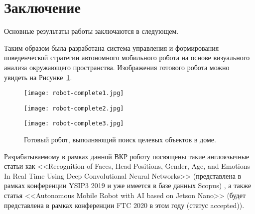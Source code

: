 \chapter*{Заключение}                       %


Основные результаты работы заключаются в следующем.

Таким образом была разработана система управления и формирования поведенческой стратегии автономного мобильного робота на основе визуального анализа окружающего пространства. Изображения готового робота можно увидеть на Рисунке~\ref{fig:robot-complete}.

\begin{figure}[ht]
  \begin{minipage}[b][][b]{0.32\linewidth}\centering
    \texttt{[image: robot-complete1.jpg]} \\
  \end{minipage}
  \hfill
  \begin{minipage}[b][][b]{0.32\linewidth}\centering
    \texttt{[image: robot-complete2.jpg]} \\
  \end{minipage}
  \hfill
  \begin{minipage}[b][][b]{0.32\linewidth}\centering
    \texttt{[image: robot-complete3.jpg]} \\
  \end{minipage}
  \caption{Готовый робот, выполняющий поиск целевых объектов в доме.}
  \label{fig:robot-complete}
\end{figure}

Разрабатываемому в рамках данной ВКР роботу посвящены такие англоязычные статьи как <<Recognition of Faces, Head Positions, Gender, Age, and Emotions In Real Time Using Deep Convolutional Neural Networks>> (представлена в рамках конференции YSIP3 2019 и уже имеется в базе данных Scopus) \cite{KurbanovEtAl:YSIP-32019}, а также статья <<Autonomous Mobile Robot with AI based on Jetson Nano>> (будет представлена в рамках конференции FTC 2020 в этом году (статус accepted))\cite{FTC2020}.
